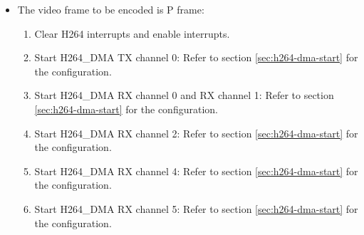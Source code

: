 \documentclass[main\_\_EN.tex]{subfiles}
\begin{document}
\begin{enumerate}
\begin{itemize}
\begin{enumerate}
            \item Clear H264 interrupts and enable interrupts.
            \item Start encoding a picture: Write 1 to register \hyperref[fielddesc:H264FRAMESTART]{H264\_FRAME\_START}.
            \item Wait for the \hyperref[int:H264DBTMPREADYINT]{H264\_DB\_TMP\_READY\_INT} interrupt. When the interrupt is triggered, start H264\_DMA TX channel 2. Refer to section \ref{sec:h264-dma-start} for the configuration.
            \item Wait for the \hyperref[int:H264FRAMEDONEINT]{H264\_FRAME\_DONE\_INT} interrupt. When the interrupt is triggered, it means that the picture encoding is completed.
            \item Make sure the data is written completely. Refer to section \ref{sec:h264-dma-reset} for the method.
            \item Reset each sending and receiving channel of H264\_DMA referring to section \ref{sec:h264-dma-reset}.
            \item Reset the read and write counter of the deblocking filter intermediate data, and the read and write counter of the reference picture data in H264\_DMA. To be specific, set register \hyperref[fielddesc:H264DMARXCH2INTERCOUNTERRST]{H264\_DMA\_RX\_CH2\_INTER\_COUNTER\_RST} to 1, and then set it to 0. Then set \hyperref[fielddesc:H264DMARXCH5INTERCOUNTERRST]{H264\_DMA\_RX\_CH5\_INTER\_COUNTER\_RST} to 1 and then to 0.
        \end{enumerate}
        \item The video frame to be encoded is P frame:
        \begin{enumerate}
            \item Clear H264 interrupts and enable interrupts.
            \item Start H264\_DMA TX channel 0: Refer to section \ref{sec:h264-dma-start} for the configuration.
            \item Start H264\_DMA RX channel 0 and RX channel 1: Refer to section \ref{sec:h264-dma-start} for the configuration.
            \item Start H264\_DMA RX channel 2: Refer to section \ref{sec:h264-dma-start} for the configuration.
            \item Start H264\_DMA RX channel 4: Refer to section \ref{sec:h264-dma-start} for the configuration.
            \item Start H264\_DMA RX channel 5: Refer to section \ref{sec:h264-dma-start} for the configuration.

\end{enumerate}
\end{itemize}
\end{enumerate}
\end{document}
